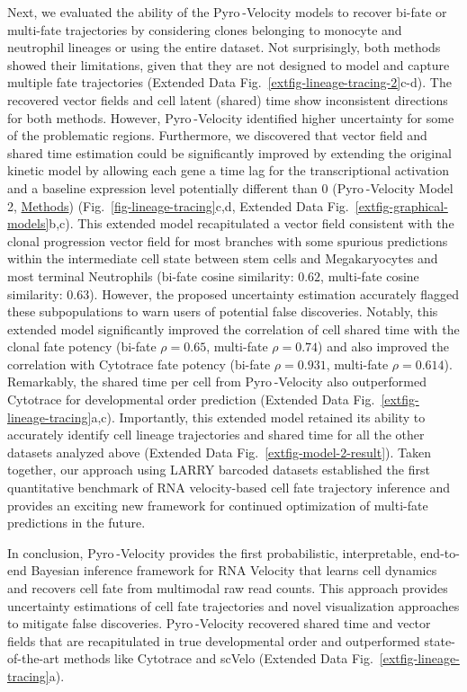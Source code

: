 \documentclass[
  sn-mathphys-num,
  lineno,
  twocolumn]{sn-jnl}
\begin{document}
Next, we evaluated the ability of the Pyro -Velocity models to recover
bi-fate or multi-fate trajectories by considering clones belonging to
monocyte and neutrophil lineages or using the entire dataset. Not
surprisingly, both methods showed their limitations, given that they are
not designed to model and capture multiple fate trajectories
(Extended Data Fig.~\ref{extfig-lineage-tracing-2}c-d). The recovered
vector fields and cell latent (shared) time show inconsistent directions
for both methods. However, Pyro -Velocity identified higher uncertainty
for some of the problematic regions. Furthermore, we discovered that
vector field and shared time estimation could be significantly improved
by extending the original kinetic model by allowing each gene a time lag
for the transcriptional activation and a baseline expression level
potentially different than 0 (Pyro -Velocity Model 2,
\hyperref[sec-methods]{Methods}) (Fig.~\ref{fig-lineage-tracing}c,d,
Extended Data Fig.~\ref{extfig-graphical-models}b,c). This extended
model recapitulated a vector field consistent with the clonal
progression vector field for most branches with some spurious
predictions within the intermediate cell state between stem cells and
Megakaryocytes and most terminal Neutrophils (bi-fate cosine similarity:
\(0.62\), multi-fate cosine similarity: \(0.63\)). However, the proposed
uncertainty estimation accurately flagged these subpopulations to warn
users of potential false discoveries. Notably, this extended model
significantly improved the correlation of cell shared time with the
clonal fate potency (bi-fate \(\rho=0.65\), multi-fate \(\rho=0.74\))
and also improved the correlation with Cytotrace fate potency (bi-fate
\(\rho=0.931\), multi-fate \(\rho=0.614\)). Remarkably, the shared time
per cell from Pyro -Velocity also outperformed Cytotrace for
developmental order prediction
(Extended Data Fig.~\ref{extfig-lineage-tracing}a,c). Importantly, this
extended model retained its ability to accurately identify cell lineage
trajectories and shared time for all the other datasets analyzed above
(Extended Data Fig.~\ref{extfig-model-2-result}). Taken together, our
approach using LARRY barcoded datasets established the first
quantitative benchmark of RNA velocity-based cell fate trajectory
inference and provides an exciting new framework for continued
optimization of multi-fate predictions in the future.

In conclusion, Pyro -Velocity provides the first probabilistic,
interpretable, end-to-end Bayesian inference framework for RNA Velocity
that learns cell dynamics and recovers cell fate from multimodal raw
read counts. This approach provides uncertainty estimations of cell fate
trajectories and novel visualization approaches to mitigate false
discoveries. Pyro -Velocity recovered shared time and vector fields that
are recapitulated in true developmental order and outperformed
state-of-the-art methods like Cytotrace and scVelo
(Extended Data Fig.~\ref{extfig-lineage-tracing}a).
\end{document}
